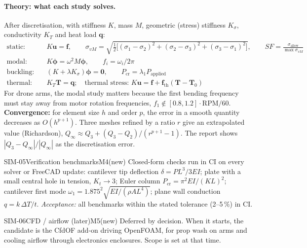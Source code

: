 \paragraph{Theory: what each study solves.} After discretisation, with stiffness $K$, mass $M$, geometric
(stress) stiffness $K_\sigma$, conductivity $K_T$ and heat load $\mathbf q$:
\[
\begin{aligned}
\text{static:}\quad & K\mathbf u=\mathbf f, \qquad \sigma_{vM}=\sqrt{\tfrac12\big[(\sigma_1-\sigma_2)^2+(\sigma_2-\sigma_3)^2+(\sigma_3-\sigma_1)^2\big]},\qquad SF=\frac{\sigma_{\text{allow}}}{\max\sigma_{vM}}\\
\text{modal:}\quad & K\boldsymbol\phi=\omega^2M\boldsymbol\phi,\qquad f_i=\omega_i/2\pi\\
\text{buckling:}\quad & (K+\lambda K_\sigma)\boldsymbol\phi=\mathbf 0,\qquad P_{\text{cr}}=\lambda_1 P_{\text{applied}}\\
\text{thermal:}\quad & K_T\mathbf T=\mathbf q;\quad\text{thermal stress: } K\mathbf u=\mathbf f+\mathbf f_{\text{th}}(\mathbf T-\mathbf T_0)
\end{aligned}
\]
For drone arms, the modal study matters because the first bending frequency must stay away from motor
rotation frequencies, $f_1 \notin [0.8,1.2]\cdot\text{RPM}/60$. \textbf{Convergence:} for element size $h$
and order $p$, the error in a smooth quantity decreases as $O(h^{p+1})$. Three meshes refined by a ratio $r$
give an extrapolated value (Richardson), $Q_\infty\approx Q_3+(Q_3-Q_2)/(r^{p+1}-1)$. The report shows
$|Q_3-Q_\infty|/|Q_\infty|$ as the discretisation error.

\begin{epic}{SIM-05}{Verification benchmarks}{M4}{\stTodo}{(new)}
Closed-form checks run in CI on every solver or FreeCAD update:
cantilever tip deflection $\delta=PL^3/3EI$;
plate with a small central hole in tension, $K_t\to3$;
Euler column $P_{\text{cr}}=\pi^2EI/(KL)^2$;
cantilever first mode $\omega_1=1.875^2\sqrt{EI/(\rho AL^4)}$;
plane wall conduction $q=k\,\Delta T/t$.
\emph{Acceptance:} all benchmarks within the stated tolerance (2--5\,\%) in CI.
\end{epic}

\begin{epic}{SIM-06}{CFD / airflow (later)}{M5}{\stTodo}{(new)}
Deferred by decision. When it starts, the candidate is the CfdOF add-on driving OpenFOAM, for prop wash on
arms and cooling airflow through electronics enclosures. Scope is set at that time.
\end{epic}
